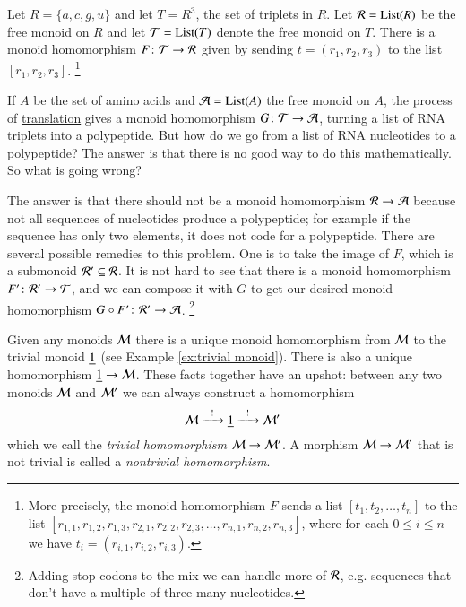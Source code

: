 \begin{application}\label{app:RNA reader 1}

Let $R=\{a,c,g,u\}$ and let $T=R^3$, the set of triplets in $R$. Let $\mcR=\List(R)$ be the free monoid on $R$ and let $\mcT=\List(T)$ denote the free monoid on $T$. There is a monoid homomorphism $F\colon\mathcal{T}\rightarrow\mathcal{R}$ given by sending $t=(r_1,r_2,r_3)$ to the list $[r_1,r_2,r_3]$.
\footnote{More precisely, the monoid homomorphism $F$ sends a list $[t_1,t_2,\ldots,t_n]$ to the list $[r_{1,1},r_{1,2},r_{1,3},r_{2,1},r_{2,2},r_{2,3},\ldots,r_{n,1},r_{n,2},r_{n,3}]$, where for each $0\leq i\leq n$ we have $t_i=(r_{i,1},r_{i,2},r_{i,3})$.}

If $A$ be the set of amino acids and $\mcA=\List(A)$ the free monoid on $A$, the process of \href{http://en.wikipedia.org/wiki/Translation_(biology)}{\text translation} gives a monoid homomorphism $G\colon\mathcal{T}\rightarrow\mathcal{A}$, turning a list of RNA triplets into a polypeptide. But how do we go from a list of RNA nucleotides to a polypeptide? The answer is that there is no good way to do this mathematically. So what is going wrong?

The answer is that there should not be a monoid homomorphism $\mathcal{R}\rightarrow\mathcal{A}$ because not all sequences of nucleotides produce a polypeptide; for example if the sequence has only two elements, it does not code for a polypeptide. There are several possible remedies to this problem. One is to take the image of $F$, which is a submonoid $\mathcal{R}'\subseteq\mathcal{R}$. It is not hard to see that there is a monoid homomorphism $F'\colon\mathcal{R}'\rightarrow\mathcal{T}$, and we can compose it with $G$ to get our desired monoid homomorphism $G\circ F'\colon\mathcal{R}'\rightarrow\mathcal{A}$. 
\footnote{Adding stop-codons to the mix we can handle more of $\mathcal{R}$, e.g. sequences that don't have a multiple-of-three many nucleotides.}

\end{application}

\begin{example}\label{ex:trivial monoid homomorphism}

Given any monoids $\mathcal{M}$ there is a unique monoid homomorphism from $\mathcal{M}$ to the trivial monoid $\underline{1}$ (see Example \ref{ex:trivial monoid}). There is also a unique homomorphism $\underline{1}\rightarrow\mathcal{M}$. These facts together have an upshot: between any two monoids $\mathcal{M}$ and $\mathcal{M}'$ we can always construct a homomorphism 
$$\mathcal{M}\xrightarrow{\ \ !\ \ }\underline{1}\xrightarrow{\ \ !\ \ }\mathcal{M}'$$
which we call the {\em trivial homomorphism $\mathcal{M}\rightarrow\mathcal{M}'$}. A morphism $\mathcal{M}\rightarrow\mathcal{M}'$ that is not trivial is called a {\em nontrivial homomorphism}.

\end{example}

